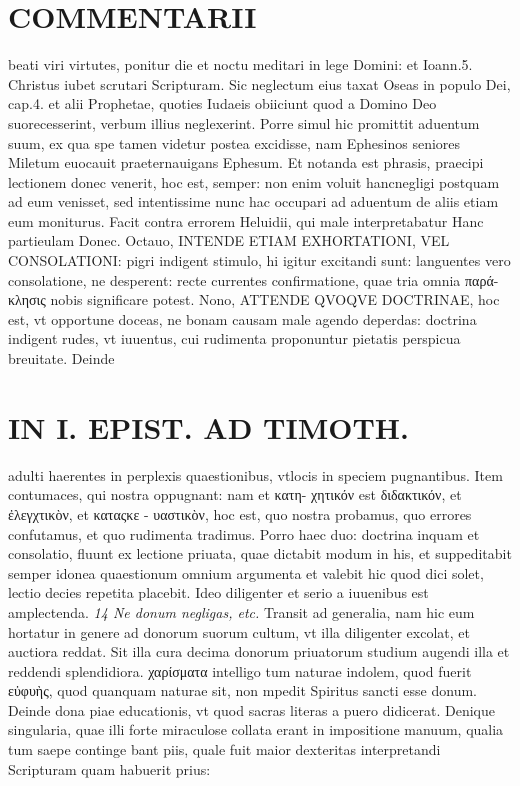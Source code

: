 \documentclass{article}
\begin{document}
\begin{pages}
\section*{COMMENTARII }
\marginpar{[ p.110 ]}\pstart beati viri virtutes, ponitur die et noctu meditari in lege Domini: et Ioann.5. Christus iubet scrutari Scripturam. Sic neglectum eius taxat Oseas in populo Dei, cap.4. et alii Prophetae, quoties Iudaeis obiiciunt quod a Domino Deo suorecesserint, verbum illius neglexerint.  \pend\pstart Porre simul hic promittit aduentum suum, ex qua spe tamen videtur postea excidisse, nam Ephesinos seniores Miletum euocauit praeternauigans Ephesum. Et notanda est phrasis, praecipi lectionem donec venerit, hoc est, semper: non enim voluit hancnegligi postquam ad eum venisset, sed intentissime nunc hac occupari ad aduentum de aliis etiam eum moniturus. Facit contra errorem Heluidii, qui male interpretabatur Hanc partieulam Donec.  \pend\pstart Octauo, INTENDE ETIAM EXHORTATIONI, VEL CONSOLATIONI: pigri indigent stimulo, hi igitur excitandi sunt: languentes vero consolatione, ne desperent: recte currentes confirmatione, quae tria omnia παρά- κλησις nobis significare potest.  \pend\pstart Nono, ATTENDE QVOQVE DOCTRINAE, hoc est, vt opportune doceas, ne bonam causam male agendo deperdas: doctrina indigent rudes, vt iuuentus, cui rudimenta proponuntur pietatis perspicua breuitate. Deinde  \pend
\section*{IN I. EPIST. AD TIMOTH. }
\marginpar{[ p.111 ]}\pstart adulti haerentes in perplexis quaestionibus, vtlocis in speciem pugnantibus. Item contumaces, qui nostra oppugnant: nam et κατη- χητικόν est διδακτικόν, et ἐλεγχτικὸν, et καταςκε - υαστικὸν, hoc est, quo nostra probamus, quo errores confutamus, et quo rudimenta tradimus. Porro haec duo: doctrina inquam et consolatio, fluunt ex lectione priuata, quae dictabit modum in his, et suppeditabit semper idonea quaestionum omnium argumenta et valebit hic quod dici solet, lectio decies repetita placebit. Ideo diligenter et serio a iuuenibus est amplectenda.  \pend
\textit{14  Ne donum negligas, etc. }\pstart Transit ad generalia, nam hic eum hortatur in genere ad donorum suorum cultum, vt illa diligenter excolat, et auctiora reddat. Sit illa cura decima donorum priuatorum studium augendi illa et reddendi splendidiora. χαρίσματα intelligo tum naturae indolem, quod fuerit εὐφυὴς, quod quanquam naturae sit, non mpedit Spiritus sancti esse donum.  \pend\pstart Deinde dona piae educationis, vt quod sacras literas a puero didicerat. Denique singularia, quae illi forte miraculose collata erant in impositione manuum, qualia tum saepe continge bant piis, quale fuit maior dexteritas interpretandi Scripturam quam habuerit prius:  \pend

\end{pages}
\end{document}
